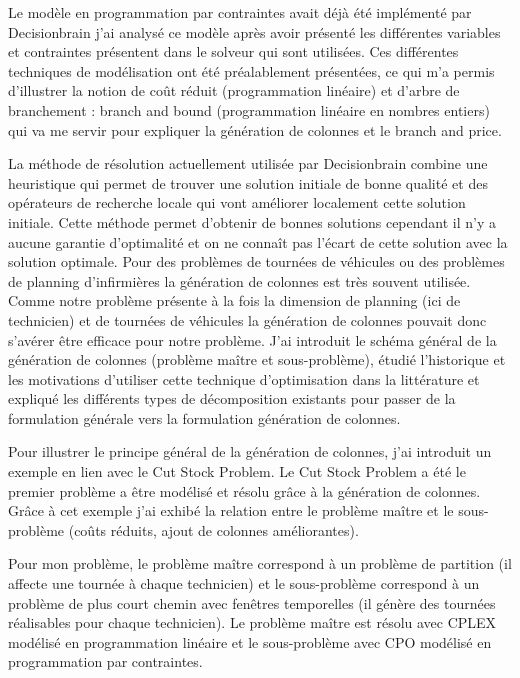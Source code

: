 \documentclass[]{report}
\begin{document}
Le modèle en programmation par contraintes avait déjà été implémenté par Decisionbrain j'ai analysé ce modèle après avoir présenté les différentes variables et contraintes présentent dans le solveur qui sont utilisées.
Ces différentes techniques de modélisation ont été préalablement présentées, ce qui m'a permis d'illustrer la notion de coût réduit (programmation linéaire) et d'arbre de branchement : branch and bound (programmation linéaire en nombres entiers) qui va me servir pour expliquer la génération de colonnes et le branch and price.


La méthode de résolution actuellement utilisée par Decisionbrain combine une heuristique qui permet de trouver une solution initiale de bonne qualité et des opérateurs de recherche locale qui vont améliorer localement cette solution initiale.
Cette méthode permet d'obtenir de bonnes solutions cependant il n'y a aucune garantie d'optimalité et on ne connaît pas l'écart de cette solution avec la solution optimale.
Pour des problèmes de tournées de véhicules ou des problèmes de planning d'infirmières la génération de colonnes est très souvent utilisée.
Comme notre problème présente à la fois la dimension de planning (ici de technicien) et de tournées de véhicules la génération de colonnes pouvait donc s'avérer être efficace pour notre problème.
J'ai introduit le schéma général de la génération de colonnes (problème maître et sous-problème), étudié l'historique et les motivations d'utiliser cette technique d'optimisation dans la littérature et expliqué les différents types de décomposition existants pour passer de la formulation générale vers la formulation génération de colonnes.

Pour illustrer le principe général de la génération de colonnes, j'ai introduit un exemple en lien avec le Cut Stock Problem.
Le Cut Stock Problem a été le premier problème a être  modélisé et résolu grâce à la génération de colonnes.
Grâce à cet exemple j'ai exhibé la relation entre le problème maître et le sous-problème (coûts réduits, ajout de colonnes améliorantes).


Pour mon problème, le problème maître correspond à un problème de partition (il affecte une tournée à chaque technicien) et le sous-problème correspond à un problème de plus court chemin avec fenêtres temporelles (il génère des tournées réalisables pour chaque technicien).
Le problème maître est résolu avec CPLEX modélisé en programmation linéaire et le sous-problème avec CPO modélisé en programmation par contraintes.
\end{document}
